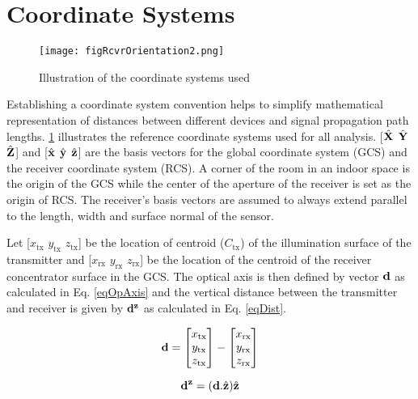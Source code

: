 \section{Coordinate Systems}
\label{sec:coordinate}
\graphicspath{{_SISO/Figures/}}

\begin{figure}[!b]
	\centering
		\texttt{[image: figRcvrOrientation2.png]}
	\caption{Illustration of the coordinate systems used}
	\label{fig:RcvrCoord}
\end{figure}

Establishing a coordinate system convention helps to simplify mathematical representation of distances between different devices and signal propagation path lengths. \figurename{ \ref{fig:RcvrCoord}} illustrates the reference coordinate systems used for all analysis. [$\hat{\bf{X}}$ $\hat{\bf{Y}}$ $\hat{\bf{Z}}$] and [$\hat{\bf{x}}$ $\hat{\bf{y}}$ $\hat{\bf{z}}$] are the basis vectors for the global coordinate system (GCS) and the receiver coordinate system (RCS). A corner of the room in an indoor space is the origin of the GCS while the center of the aperture of the receiver is set as the origin of RCS. The receiver's basis vectors are assumed to always extend parallel to the length, width and surface normal of the sensor. 

Let [$x_{\text{tx}}$ $y_{\text{tx}}$ $z_{\text{tx}}$] be the location of centroid ($C_{\text{tx}}$) of the illumination surface of the transmitter and [$x_{\text{rx}}$ $y_{\text{rx}}$ $z_{\text{rx}}$] be the location of the centroid of the receiver concentrator surface in the GCS. The optical axis is then defined by vector ${\bf{d}}$ as calculated in Eq. \eqref{eqOpAxis} and the vertical distance between the transmitter and receiver is given by ${\bf{d}^{z}}$ as calculated in Eq. \eqref{eqDist}.

\begin{equation}
\label{eqOpAxis}
	{\bf{d}}=\left[ \begin{matrix} x_{\text{tx}}\\ y_{\text{tx}}\\ z_{\text{tx}} \end{matrix} \right] - \left[ \begin{matrix} x_{\text{rx}}\\ y_{\text{rx}}\\ z_{\text{rx}} \end{matrix} \right]
\end{equation}

\begin{equation}
\label{eqDist}
	{\bf{d}^{z}}=({\bf{d}}.{\hat{\bf{z}}}){\hat{\bf{z}}}
\end{equation}

